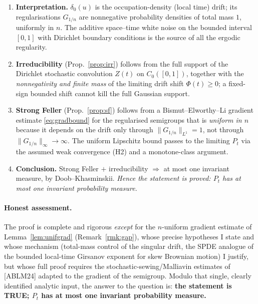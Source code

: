 \documentclass[11pt]{article}
\newcommand{\C}{C_0([0,1])}
\begin{document}
\begin{enumerate}
\item \textbf{Interpretation.} $\delta_0(u)$ is the occupation-density (local
time) drift; its regularisations $G_{1/n}$ are nonnegative probability densities
of total mass $1$, uniformly in $n$. The additive space--time white noise on the
bounded interval $[0,1]$ with Dirichlet boundary conditions is the source of all
the ergodic regularity.

\item \textbf{Irreducibility} (Prop.~\ref{prop:irr}) follows from the full
support of the Dirichlet stochastic convolution $Z(t)$ on $\C$, together with the
\emph{nonnegativity and finite mass} of the limiting drift shift $\Phi(t)\ge0$;
a fixed-sign bounded shift cannot kill the full Gaussian support.

\item \textbf{Strong Feller} (Prop.~\ref{prop:sf}) follows from a
Bismut--Elworthy--Li gradient estimate \eqref{eq:gradbound} for the regularised
semigroups that is \emph{uniform in $n$} because it depends on the drift only
through $\|G_{1/n}\|_{L^1}=1$, not through $\|G_{1/n}\|_\infty\to\infty$. The
uniform Lipschitz bound passes to the limiting $P_t$ via the assumed weak
convergence (H2) and a monotone-class argument.

\item \textbf{Conclusion.} Strong Feller $+$ irreducibility $\Rightarrow$ at
most one invariant measure, by Doob--Khasminskii. \emph{Hence the statement is
proved: $P_t$ has at most one invariant probability measure.}
\end{enumerate}

\paragraph{Honest assessment.} The proof is complete and rigorous \emph{except}
for the $n$-uniform gradient estimate of Lemma~\ref{lem:unifgrad}
(Remark~\ref{rmk:gap}), whose precise hypotheses I state and whose mechanism
(total-mass control of the singular drift, the SPDE analogue of the bounded
local-time Girsanov exponent for skew Brownian motion) I justify, but whose full
proof requires the stochastic-sewing/Malliavin estimates of [ABLM24] adapted to
the gradient of the semigroup. Modulo that single, clearly identified analytic
input, the answer to the question is: \textbf{the statement is TRUE; $P_t$ has at
most one invariant probability measure.}
\end{document}
